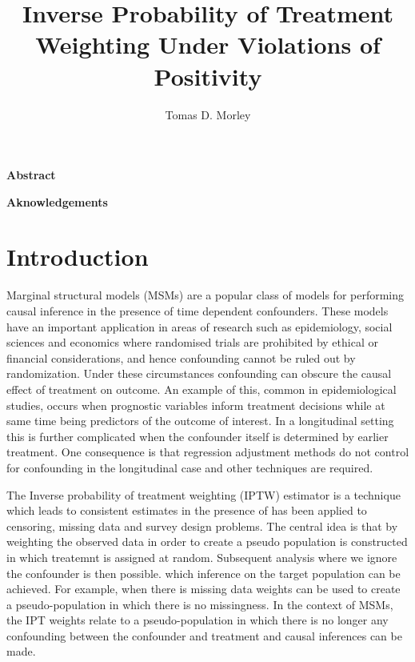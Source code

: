 \documentclass[11pt]{article}
\title{Inverse Probability of Treatment Weighting Under Violations of Positivity}
\author{Tomas D. Morley}
\begin{document}
    
    
    \maketitle
    
    

    
    \newpage

    \textbf{Abstract}

    \newpage

    \textbf{Aknowledgements}

    \newpage

\tableofcontents{}

    \newpage

\section{Introduction}\label{introduction}

Marginal structural models (MSMs) are a popular class of models for
performing causal inference in the presence of time dependent
confounders. These models have an important application in areas of
research such as epidemiology, social sciences and economics where
randomised trials are prohibited by ethical or financial considerations,
and hence confounding cannot be ruled out by randomization. Under these
circumstances confounding can obscure the causal effect of treatment on
outcome. An example of this, common in epidemiological studies, occurs
when prognostic variables inform treatment decisions while at same time
being predictors of the outcome of interest. In a longitudinal setting
this is further complicated when the confounder itself is determined by
earlier treatment. One consequence is that regression adjustment methods
do not control for confounding in the longitudinal case and other
techniques are required. \linebreak

The Inverse probability of treatment weighting (IPTW) estimator is a
technique which leads to consistent estimates in the presence of has
been applied to censoring, missing data and survey design problems. The
central idea is that by weighting the observed data in order to create a
pseudo population is constructed in which treatemnt is assigned at
random. Subsequent analysis where we ignore the confounder is then
possible. which inference on the target population can be achieved. For
example, when there is missing data weights can be used to create a
pseudo-population in which there is no missingness. In the context of
MSMs, the IPT weights relate to a pseudo-population in which there is no
longer any confounding between the confounder and treatment and causal
inferences can be made. \linebreak
\end{document}
